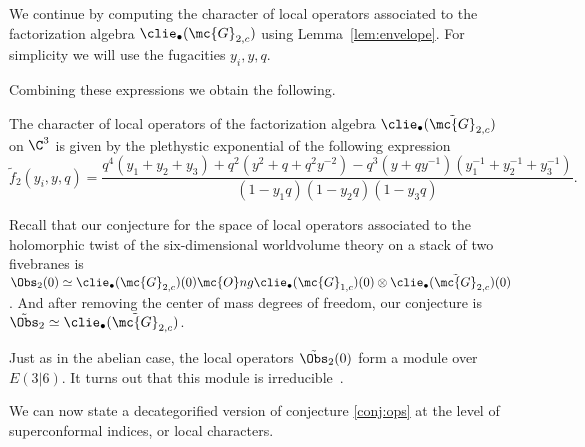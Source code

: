 
\parsec

We continue by computing the character of local operators associated to the factorization algebra $\clie_\bullet(\mc{G}_{2,c})$ using Lemma~\ref{lem:envelope}.
For simplicity we will use the fugacities $y_i, y, q$.



Combining these expressions we obtain the following.

\begin{prop} \label{prop:6dtwo}
The character of local operators of the factorization algebra $\clie_\bullet(\tilde {\mc{G}}_{2,c})$ on $\C^3$ is given by the plethystic exponential of the following expression
\begin{equation}\label{eqn:6dtwo}
\tilde f_{2} (y_i,y,q) = \frac{q^4(y_1+y_2+y_3) + q^2 (y^2 + q + q^2 y^{-2}) - q^{3} (y + q y^{-1})(y_1^{-1} + y_2^{-1} + y_3^{-1})}{(1-y_1q) (1-y_2 q) (1-y_3 q)}.
\end{equation}
\end{prop}

Recall that our conjecture for the space of local operators associated to the holomorphic twist of the six-dimensional worldvolume theory on a stack of two fivebranes is $\Obs_2 (0) \simeq \clie_\bullet(\mc{G}_{2,c})(0) \mc{O}ng \clie_\bullet(\mc{G}_{1,c})(0) \otimes \clie_\bullet(\tilde {\mc{G}}_{2,c})(0)$. 
And after removing the center of mass degrees of freedom, our conjecture is $\tilde \Obs_2 \simeq \clie_\bullet(\tilde {\mc{G}}_{2,c})$.

Just as in the abelian case, the local operators $\tilde \Obs_2(0)$ form a module over $E(3|6)$.
It turns out that this module is irreducible~\cite{KR2}.

We can now state a decategorified version of conjecture \ref{conj:ops} at the level of superconformal indices, or local characters.

